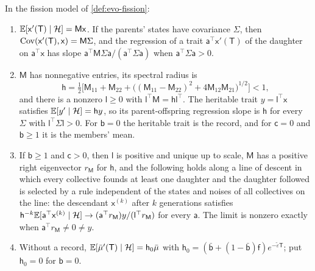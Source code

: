 \begin{proposition}\label{prop:evo-transmission}
In the fission model of \cref{def:evo-fission}:
\begin{enumerate}
\item[(a)] $\mathbb{E}[\mathsf x'(\mathsf T)\mid\mathcal H]=\mathsf M\mathsf x$. If the parents' states have covariance $\Sigma$, then $\operatorname{Cov}(\mathsf x'(\mathsf T),\mathsf x)=\mathsf M\Sigma$, and the regression of a trait $\mathsf a^\top\mathsf x'(\mathsf T)$ of the daughter on $\mathsf a^\top\mathsf x$ has slope $\mathsf a^\top\mathsf M\Sigma\mathsf a/(\mathsf a^\top\Sigma\mathsf a)$ when $\mathsf a^\top\Sigma\mathsf a>0$.
\item[(b)] $\mathsf M$ has nonnegative entries, its spectral radius is
\begin{equation}\label{eq:evo-heritability}
\mathsf h=\tfrac12\bigl[\mathsf M_{11}+\mathsf M_{22}+\bigl((\mathsf M_{11}-\mathsf M_{22})^2+4\mathsf M_{12}\mathsf M_{21}\bigr)^{1/2}\bigr]<1,
\end{equation}
and there is a nonzero $\mathsf l\ge0$ with $\mathsf l^\top\mathsf M=\mathsf h\mathsf l^\top$. The heritable trait $y=\mathsf l^\top\mathsf x$ satisfies $\mathbb{E}[y'\mid\mathcal H]=\mathsf hy$, so its parent-offspring regression slope is $\mathsf h$ for every $\Sigma$ with $\mathsf l^\top\Sigma\mathsf l>0$. For $\mathsf b=0$ the heritable trait is the record, and for $\mathsf c=0$ and $\mathsf b\ge1$ it is the members' mean.
\item[(c)] If $\mathsf b\ge1$ and $\mathsf c>0$, then $\mathsf l$ is positive and unique up to scale, $\mathsf M$ has a positive right eigenvector $r_{\mathsf M}$ for $\mathsf h$, and the following holds along a line of descent in which every collective founds at least one daughter and the daughter followed is selected by a rule independent of the states and noises of all collectives on the line: the descendant $\mathsf x^{(k)}$ after $k$ generations satisfies $\mathsf h^{-k}\mathbb{E}[\mathsf a^\top\mathsf x^{(k)}\mid\mathcal H]\to(\mathsf a^\top r_{\mathsf M})y/(\mathsf l^\top r_{\mathsf M})$ for every $\mathsf a$. The limit is nonzero exactly when $\mathsf a^\top r_{\mathsf M}\ne0\ne y$.
\item[(d)] Without a record, $\mathbb{E}[\bar\mu'(\mathsf T)\mid\mathcal H]=\mathsf h_0\bar\mu$ with $\mathsf h_0=(\bar{\mathsf b}+(1-\bar{\mathsf b})\mathsf f)e^{-\tilde\varepsilon\mathsf T}$; put $\mathsf h_0=0$ for $\mathsf b=0$.
\end{enumerate}
\end{proposition}

